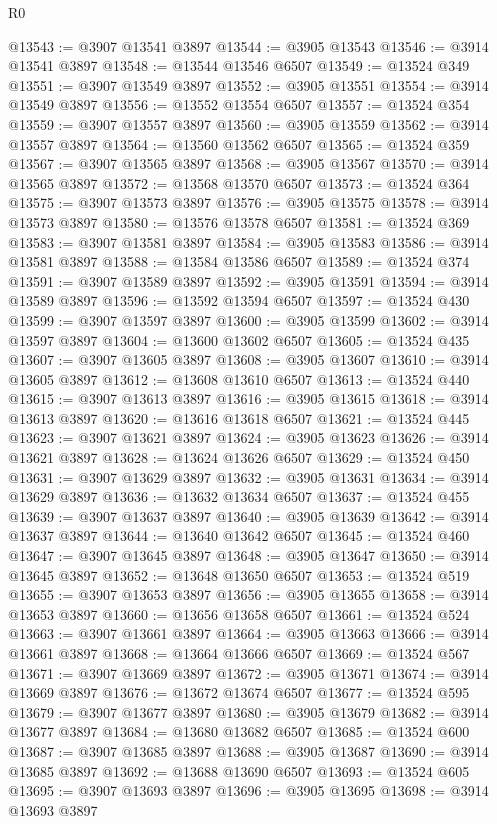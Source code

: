 \begin{lexlean}{R0}
\begin{coremodule}
@13543 := @3907 @13541 @3897
@13544 := @3905 @13543
@13546 := @3914 @13541 @3897
@13548 := @13544 @13546 @6507
@13549 := @13524 @349
@13551 := @3907 @13549 @3897
@13552 := @3905 @13551
@13554 := @3914 @13549 @3897
@13556 := @13552 @13554 @6507
@13557 := @13524 @354
@13559 := @3907 @13557 @3897
@13560 := @3905 @13559
@13562 := @3914 @13557 @3897
@13564 := @13560 @13562 @6507
@13565 := @13524 @359
@13567 := @3907 @13565 @3897
@13568 := @3905 @13567
@13570 := @3914 @13565 @3897
@13572 := @13568 @13570 @6507
@13573 := @13524 @364
@13575 := @3907 @13573 @3897
@13576 := @3905 @13575
@13578 := @3914 @13573 @3897
@13580 := @13576 @13578 @6507
@13581 := @13524 @369
@13583 := @3907 @13581 @3897
@13584 := @3905 @13583
@13586 := @3914 @13581 @3897
@13588 := @13584 @13586 @6507
@13589 := @13524 @374
@13591 := @3907 @13589 @3897
@13592 := @3905 @13591
@13594 := @3914 @13589 @3897
@13596 := @13592 @13594 @6507
@13597 := @13524 @430
@13599 := @3907 @13597 @3897
@13600 := @3905 @13599
@13602 := @3914 @13597 @3897
@13604 := @13600 @13602 @6507
@13605 := @13524 @435
@13607 := @3907 @13605 @3897
@13608 := @3905 @13607
@13610 := @3914 @13605 @3897
@13612 := @13608 @13610 @6507
@13613 := @13524 @440
@13615 := @3907 @13613 @3897
@13616 := @3905 @13615
@13618 := @3914 @13613 @3897
@13620 := @13616 @13618 @6507
@13621 := @13524 @445
@13623 := @3907 @13621 @3897
@13624 := @3905 @13623
@13626 := @3914 @13621 @3897
@13628 := @13624 @13626 @6507
@13629 := @13524 @450
@13631 := @3907 @13629 @3897
@13632 := @3905 @13631
@13634 := @3914 @13629 @3897
@13636 := @13632 @13634 @6507
@13637 := @13524 @455
@13639 := @3907 @13637 @3897
@13640 := @3905 @13639
@13642 := @3914 @13637 @3897
@13644 := @13640 @13642 @6507
@13645 := @13524 @460
@13647 := @3907 @13645 @3897
@13648 := @3905 @13647
@13650 := @3914 @13645 @3897
@13652 := @13648 @13650 @6507
@13653 := @13524 @519
@13655 := @3907 @13653 @3897
@13656 := @3905 @13655
@13658 := @3914 @13653 @3897
@13660 := @13656 @13658 @6507
@13661 := @13524 @524
@13663 := @3907 @13661 @3897
@13664 := @3905 @13663
@13666 := @3914 @13661 @3897
@13668 := @13664 @13666 @6507
@13669 := @13524 @567
@13671 := @3907 @13669 @3897
@13672 := @3905 @13671
@13674 := @3914 @13669 @3897
@13676 := @13672 @13674 @6507
@13677 := @13524 @595
@13679 := @3907 @13677 @3897
@13680 := @3905 @13679
@13682 := @3914 @13677 @3897
@13684 := @13680 @13682 @6507
@13685 := @13524 @600
@13687 := @3907 @13685 @3897
@13688 := @3905 @13687
@13690 := @3914 @13685 @3897
@13692 := @13688 @13690 @6507
@13693 := @13524 @605
@13695 := @3907 @13693 @3897
@13696 := @3905 @13695
@13698 := @3914 @13693 @3897

\end{coremodule}
\end{lexlean}
